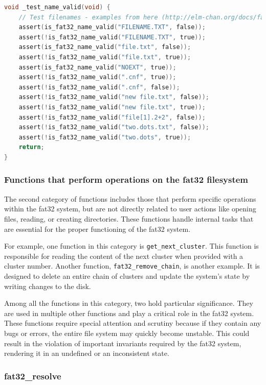 \begin{lstlisting}[caption={Example of unit test (true or false indicates if the name is for a directory)},captionpos=b,language=C,frame=single,breaklines]
void _test_name_valid(void) {
    // Test filenames - examples from here (http://elm-chan.org/docs/fat_e.html)
    assert(is_fat32_name_valid("FILENAME.TXT", false));
    assert(!is_fat32_name_valid("FILENAME.TXT", true));
    assert(is_fat32_name_valid("file.txt", false));
    assert(!is_fat32_name_valid("file.txt", true));
    assert(is_fat32_name_valid("NOEXT", true));
    assert(!is_fat32_name_valid(".cnf", true));
    assert(!is_fat32_name_valid(".cnf", false));
    assert(!is_fat32_name_valid("new file.txt", false));
    assert(!is_fat32_name_valid("new file.txt", true));
    assert(!is_fat32_name_valid("file[1].2+2", false));
    assert(!is_fat32_name_valid("two.dots.txt", false));
    assert(!is_fat32_name_valid("two.dots", true));
    return;
}
\end{lstlisting}


\subsubsection{Functions that perform operations on the fat32 filesystem}

The second category of functions includes those that perform specific operations within the fat32 system, but are not directly related to user actions like opening files, reading, or creating directories. These functions handle internal tasks that are essential for the proper functioning of the fat32 system.

For example, one function in this category is \texttt{get\_next\_cluster}. This function is responsible for reading the content of the next cluster when provided with a cluster number. Another function, \texttt{fat32\_remove\_chain}, is another example. It is designed to delete an entire chain of clusters and update the system's state by writing changes to the disk.

Among all the functions in this category, two hold particular significance. They are used in multiple other functions and play a critical role in the fat32 system. These functions require special attention and scrutiny because if they contain any bugs or errors, the entire file system may quickly become unstable. This could result in the violation of important invariants required by the fat32 system, rendering it in an undefined or an inconsistent state.

\subsubsection{fat32\_resolve}

